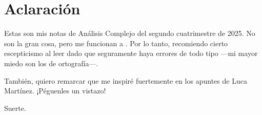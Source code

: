 \chapter*{Aclaración}

Estas son mis notas de Análisis Complejo del segundo cuatrimestre de 2025. No son la gran cosa, pero me funcionan a . Por lo tanto, recomiendo cierto escepticismo al leer dado que seguramente haya errores de todo tipo ---mi mayor miedo son los de ortografía---.

También, quiero remarcar que me inspiré fuertemente en los apuntes de Luca Martínez. ¡Péguenles un vistazo!

Suerte.